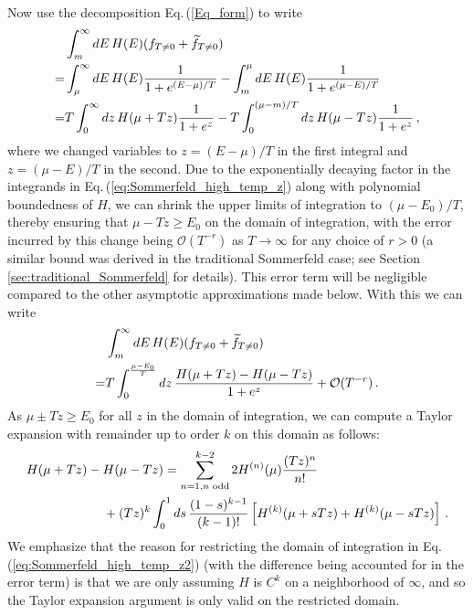 \documentclass[sn-mathphys,Numbered]{sn-jnl}
\newcommand{\req}[1]{Eq.\,(\ref{#1})}
\begin{document}
Now use the decomposition \req{Eq_form} to write
\begin{align}
 &\int_m^\infty dE\, H(E)(f_{T\neq 0}+\widetilde{f}_{T\neq 0})\notag\\
 =&\int_\mu^\infty dE \,H(E)\frac{1}{1+e^{(E-\mu)/T}}-\int_m^\mu dE\, H(E)\frac{1}{1+e^{(\mu-E)/T}}\notag\\
=&T\int_0^\infty dz \,H(\mu+Tz)\frac{1}{1+e^{z}}-T\int^{(\mu-m)/T}_0 dz\, H(\mu-Tz)\frac{1}{1+e^{z}}\,,\label{eq:Sommerfeld_high_temp_z}
\end{align}
where we changed variables to $z=(E-\mu)/T$ in the first integral and $z=(\mu-E)/T$ in the second. Due to the exponentially decaying factor in the integrands in \req{eq:Sommerfeld_high_temp_z} along with polynomial boundedness of $H$, we can shrink the upper limits of integration to $(\mu-E_0)/T$, thereby ensuring that $\mu-Tz\geq E_0$ on the domain of integration, with the error incurred by this change being $\mathcal{O}(T^{-r})$ as $T\to \infty$ for any choice of $r>0$ (a similar bound was derived in the traditional Sommerfeld case; see Section \ref{sec:traditional_Sommerfeld} for details). This error term will be negligible compared to the other asymptotic approximations made below. With this we can write
\begin{align}
 &\int_m^\infty dE\, H(E)(f_{T\neq 0}+\widetilde{f}_{T\neq 0})\notag\\
=&T\int_0^{\frac{\mu-E_0}{T}} dz \,\frac{H(\mu+Tz)- H(\mu-Tz)}{1+e^{z}}+\mathcal{O}(T^{-r})\,. \label{eq:Sommerfeld_high_temp_z2}
\end{align}
As $\mu\pm Tz\geq E_0$ for all $z$ in the domain of integration, we can compute a Taylor expansion with remainder up to order $k$ on this domain as follows:
\begin{align}\label{eq:H_diff_Taylor}
 &H(\mu+Tz)- H(\mu-Tz)=\sum_{n=1,n\text{ odd}}^{k-2} 2H^{(n)}(\mu)\frac{(Tz)^n}{n!}\\
 &\qquad\qquad\qquad+(Tz)^k \int_0^1 ds\,\frac{(1-s)^{k-1}}{(k-1)!} \left[H^{(k)}(\mu+sTz)+H^{(k)}(\mu-sTz)\right]\,. \notag
\end{align}
We emphasize that the reason for restricting the domain of integration in \req{eq:Sommerfeld_high_temp_z2} (with the difference being accounted for in the error term) is that we are only assuming $H$ is $C^k$ on a neighborhood of $\infty$, and so the Taylor expansion argument is only valid on the restricted domain.
\end{document}
